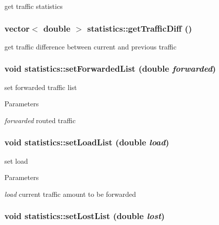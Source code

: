 get traffic statistics 

\hypertarget{classstatistics_a7aa58e77f08e583a87f9050a5b1cf4f9}{
\subsubsection[{getTrafficDiff}]{\setlength{\rightskip}{0pt plus 5cm}vector$<$ double $>$ statistics::getTrafficDiff ()}}
\label{classstatistics_a7aa58e77f08e583a87f9050a5b1cf4f9}


get traffic difference between current and previous traffic 

\hypertarget{classstatistics_a94f979fcc6d511583638d6fc12116992}{
\subsubsection[{setForwardedList}]{\setlength{\rightskip}{0pt plus 5cm}void statistics::setForwardedList (double {\em forwarded})}}
\label{classstatistics_a94f979fcc6d511583638d6fc12116992}


set forwarded traffic list 


\begin{DoxyParams}{Parameters}
\item[{\em forwarded}]routed traffic \end{DoxyParams}
\hypertarget{classstatistics_af1594f7585e2c0776ef2f8fb7ddd3fca}{
\subsubsection[{setLoadList}]{\setlength{\rightskip}{0pt plus 5cm}void statistics::setLoadList (double {\em load})}}
\label{classstatistics_af1594f7585e2c0776ef2f8fb7ddd3fca}


set load 


\begin{DoxyParams}{Parameters}
\item[{\em load}]current traffic amount to be forwarded \end{DoxyParams}
\hypertarget{classstatistics_a84bead3d62e23af1777b5e54c6de48de}{
\subsubsection[{setLostList}]{\setlength{\rightskip}{0pt plus 5cm}void statistics::setLostList (double {\em lost})}}
\label{classstatistics_a84bead3d62e23af1777b5e54c6de48de}


